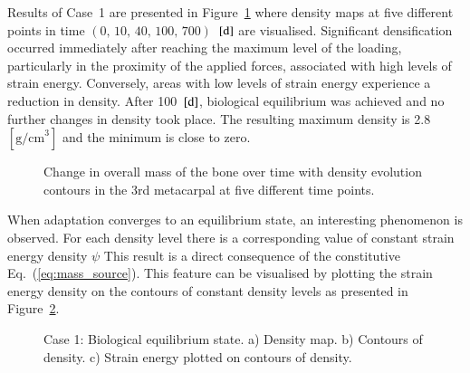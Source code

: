 \documentclass[11pt]{acmeArticle}
\numberwithin{equation}{section}
\begin{document}
Results of Case~1 are presented in Figure~\ref{fig:mc3_density} where density maps at five different points in time $(\text{0, 10, 40, 100, 700})$~$[\text d]$ are visualised. 
Significant densification occurred immediately after reaching the maximum level of the loading, particularly in the proximity of the applied forces, associated with high levels of strain energy. Conversely, areas with low levels of strain energy experience a reduction in density.
After 100~$[{\text d}]$, biological equilibrium was achieved and no further changes in density took place. 
The resulting maximum density is 2.8~$[{\text {g/cm}}^3]$ and the minimum is close to zero.
\begin{figure}[h!]
	\centering
	\caption{Change in overall mass of the bone over time with density evolution contours in the 3rd metacarpal at five different time points.}
	\label{fig:mc3_density}
\end{figure}



When adaptation converges to an equilibrium state, an interesting phenomenon is observed.
For each density level there is a corresponding value of constant strain energy density $\psi$
This result is a direct consequence of the constitutive Eq.~(\ref{eq:mass_source}).
This feature can be visualised by plotting the strain energy density on the contours of constant density levels as presented in Figure~\ref{fig:mc3_biol_eq}. 


\begin{figure}
	\centering
	\def\svgwidth{14cm}
	
	\caption{Case 1: Biological equilibrium state. a) Density map. b) Contours of density. c) Strain energy plotted on contours of density.}
	\label{fig:mc3_biol_eq}
\end{figure}
\end{document}
